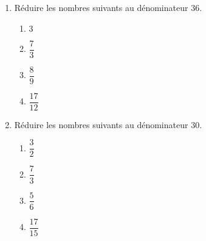 \begin{exercice*}
    \begin{enumerate}
        \item Réduire les nombres suivants au dénominateur \num{36}.
        \begin{multicols}{2}
            \begin{spacing}{1.5}
                \begin{enumerate}
                    \item $3$
                    \item $\dfrac{7}{3}$
                    \item $\dfrac{8}{9}$
                    \item $\dfrac{17}{12}$
                \end{enumerate}
            \end{spacing}
        \end{multicols}
        \item Réduire les nombres suivants au dénominateur \num{30}.
        \begin{multicols}{2}
            \begin{spacing}{1.5}
                \begin{enumerate}
                    \item $\dfrac{3}{2}$
                    \item $\dfrac{7}{3}$
                    \item $\dfrac{5}{6}$
                    \item $\dfrac{17}{15}$
                \end{enumerate}
            \end{spacing}
        \end{multicols}
    \end{enumerate}
\end{exercice*}
